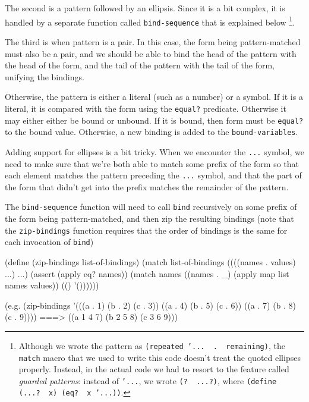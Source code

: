 The second is a pattern followed by an ellipsis. Since it is a bit
complex, it is handled by a separate function called \texttt{bind\--sequence}
that is explained below \footnote{
  Although we wrote the pattern as \texttt{(repeated '...\,\,.\,\,remaining)},
  the \texttt{match} macro that we used to write this code doesn't treat
  the quoted ellipses properly. Instead, in the actual code we had to
  resort to the feature called \textit{guarded patterns}: instead
  of \texttt{'...}, we wrote \texttt{(?\,\,...?)}, where 
  \texttt{(define (...?\,\,x) (eq?\,\,x '...))}.
}.

The third is when pattern is a pair. In this case, the form being
pattern-matched must also be a pair, and we should be able to bind
the head of the pattern with the head of the form, and the tail
of the pattern with the tail of the form, unifying the bindings.

Otherwise, the pattern is either a literal (such as a number)
or a symbol. If it is a literal, it is compared with the form
using the \texttt{equal?} predicate. Otherwise it may either
either be bound or unbound. If it is bound, then form must
be \texttt{equal?} to the bound value. Otherwise, a new binding
is added to the \texttt{bound-variables}.

Adding support for ellipses is a bit tricky. When we encounter the
\texttt{...} symbol, we need to make sure that we're both able to
match some prefix of the form so that each element matches
the pattern preceding the \texttt{...} symbol, and that the part
of the form that didn't get into the prefix matches the remainder
of the pattern.

The \texttt{bind-sequence} function will need to call \texttt{bind}
recursively on some prefix of the form being pattern-matched, and
then zip the resulting bindings (note that the \texttt{zip-bindings}
function requires that the order of bindings is the same
for each invocation of \texttt{bind})

\begin{Snippet}
  (define (zip-bindings list-of-bindings)
    (match list-of-bindings
      ((((names . values) ...) ...)
       (assert (apply eq? names))
       (match names
         ((names . _)
          (apply map list names values))
         (()
	  '())))))
\end{Snippet}

\begin{Snippet}
  (e.g.
   (zip-bindings '(((a . 1) (b . 2) (c . 3))
		   ((a . 4) (b . 5) (c . 6))
		   ((a . 7) (b . 8) (c . 9))))
   ===> ((a 1 4 7) (b 2 5 8) (c 3 6 9)))
\end{Snippet}

